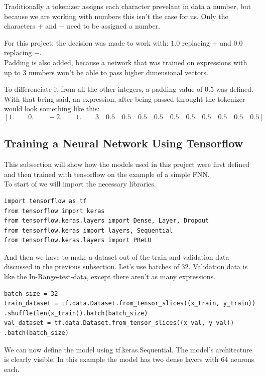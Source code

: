 \documentclass{article}
\begin{document}
Traditionally a tokenizer assigns each character prevelant in data a number, 
but because we are working with numbers this isn't the case for us. Only the 
characters $+$ and $-$ need to be assigned a number.

For this project: the decision was made to work with: $1.0$ replacing $+$ and 
$0.0$ replacing $-$.
\\[2em]

Padding is also added, because a network that was trained on expressions with 
up to 3 numbers won't be able to pass higher dimensional vectors.

To differenciate it from all the other integers, a padding value of $0.5$ was 
defined.
\\[2em]
With that being said, an expression, after being passed throught the tokenizer 
would look something like this: 
$$
[1.\qquad 0.\qquad -2.\qquad 1.\qquad 3\quad 0.5\quad 0.5\quad 0.5\quad 0.5\quad 0.5\quad 0.5\quad 0.5\quad 0.5\quad 0.5\quad 0.5]
$$
\subsection{Training a Neural Network Using Tensorflow}
This subsection will show how the models used in this project were first 
defined and then trained with tensorflow on the example of a simple FNN.
\\[2em]
To start of we will import the necessary libraries.
\begin{Verbatim}
import tensorflow as tf
from tensorflow import keras
from tensorflow.keras.layers import Dense, Layer, Dropout
from tensorflow.keras import layers, Sequential
from tensorflow.keras.layers import PReLU
\end{Verbatim}

And then we have to make a dataset out of the train and validation data 
discussed in the previous subsection. Let's use batches of 32.
Validation data is like the In-Range-test-data, except there aren't as many
expressions.
\begin{Verbatim}
batch_size = 32
train_dataset = tf.data.Dataset.from_tensor_slices((x_train, y_train))
.shuffle(len(x_train)).batch(batch_size)
val_dataset = tf.data.Dataset.from_tensor_slices((x_val, y_val))
.batch(batch_size)
\end{Verbatim}

We can now define the model using tf.keras.Sequential. The model's 
architecture is clearly visible. In this example the model has two dense 
layers with 64 neurons each.
\end{document}

